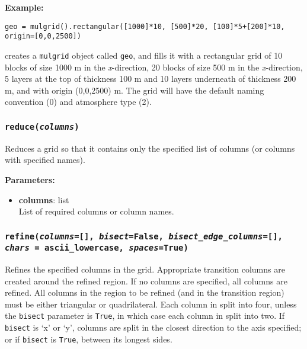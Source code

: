 \textbf{Example:}

\begin{lstlisting}
geo = mulgrid().rectangular([1000]*10, [500]*20, [100]*5+[200]*10, origin=[0,0,2500])
\end{lstlisting}

creates a \texttt{mulgrid} object called \texttt{geo}, and fills it with a rectangular grid of 10 blocks of size 1000 m in the \emph{x}-direction, 20 blocks of size 500 m in the \emph{x}-direction, 5 layers at the top of thickness 100 m and 10 layers underneath of thickness 200 m, and with origin (0,0,2500) m.  The grid will have the default naming convention (0) and atmosphere type (2).

\begin{snugshade}\subsubsection{\texttt{reduce(\emph{columns})}}\end{snugshade}
\label{sec:mulgrid:reduce}

Reduces a grid so that it contains only the specified list of columns (or columns with specified names).

\textbf{Parameters:}
\begin{itemize}
  \item \textbf{columns}: list\\
    List of required columns or column names.
\end{itemize}

\begin{snugshade}\subsubsection{\texttt{refine(\emph{columns}=[], \emph{bisect}=False, \emph{bisect\_edge\_columns}=[],\\
    \emph{chars} = ascii\_lowercase, \emph{spaces}=\texttt{True})}}\end{snugshade}
\label{sec:mulgrid:refine}

Refines the specified columns in the grid.  Appropriate transition columns are created around the refined region.  If no columns are specified, all columns are refined.  All columns in the region to be refined (and in the transition region) must be either triangular or quadrilateral.  Each column in split into four, unless the \texttt{bisect} parameter is \texttt{True}, in which case each column in split into two.  If \texttt{bisect} is `x' or `y', columns are split in the closest direction to the axis specified; or if \texttt{bisect} is \texttt{True}, between its longest sides.

